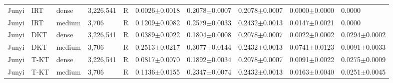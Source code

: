 \documentclass[10pt,a4paper]{article}
\begin{document}
\begin{minipage}{\textwidth}
\begin{adjustbox}{max width=\textwidth}
{\begin{tabular}{@{}llllllllll@{}}
Junyi & IRT & dense & 3,226,541 & R & 0.0026$\pm$0.0018 & 0.2078$\pm$0.0007 & 0.2078$\pm$0.0007 & 0.0000$\pm$0.0000 & 0.0000 \\
Junyi & IRT & medium & 3,706 & R & 0.1209$\pm$0.0082 & 0.2579$\pm$0.0033 & 0.2432$\pm$0.0013 & 0.0147$\pm$0.0021 & 0.0000 \\
Junyi & DKT & dense & 3,226,541 & R & 0.0389$\pm$0.0022 & 0.1804$\pm$0.0008 & 0.2078$\pm$0.0007 & 0.0022$\pm$0.0002 & 0.0294$\pm$0.0002 \\
Junyi & DKT & medium & 3,706 & R & 0.2513$\pm$0.0217 & 0.3077$\pm$0.0144 & 0.2432$\pm$0.0013 & 0.0741$\pm$0.0123 & 0.0091$\pm$0.0033 \\
Junyi & T-KT & dense & 3,226,541 & R & 0.0817$\pm$0.0070 & 0.1892$\pm$0.0034 & 0.2078$\pm$0.0007 & 0.0091$\pm$0.0022 & 0.0275$\pm$0.0009 \\
Junyi & T-KT & medium & 3,706 & R & 0.1136$\pm$0.0155 & 0.2347$\pm$0.0074 & 0.2432$\pm$0.0013 & 0.0163$\pm$0.0040 & 0.0251$\pm$0.0045 \\
\bottomrule
\end{tabular}}
\end{adjustbox}
\end{minipage}
\vspace{18pt}
\end{document}
